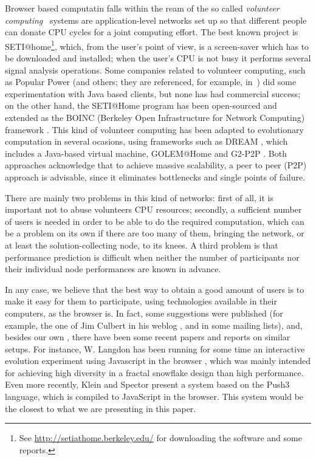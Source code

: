 \documentclass{llncs}
\begin{document}
Browser based computatin falls within the ream of the so called  {\em volunteer
computing}~\cite{sarmenta-bayanihan,hpvc} systems are
application-level networks set up so that different people
can donate CPU cycles for a joint computing  effort.
The best known project is SETI@home\footnote{See
\url{http://setiathome.berkeley.edu/} for downloading the software  and some
reports.}, which, from the user's point of view, is a screen-saver which has to be
downloaded and installed; when the user's CPU is not busy it performs
several signal analysis operations.
Some companies related to volunteer computing, such as Popular Power (and
others; they are referenced,
for example, in~\cite{Cappello}) did some experimentation with Java based
clients, but none has had commercial success; on the other hand, the
SETI@Home program has been open-sourced and extended as the BOINC
(Berkeley Open Infrastructure for Network Computing) 
framework \cite{boinc_grid04}. This kind of volunteer computing has
been adapted to evolutionary computation in several ocasions, using
frameworks such as DREAM \cite{LNCS2439:ID197:pp665}, which includes a
Java-based virtual machine, GOLEM@Home and G2-P2P \cite{G2-P2P}. Both approaches
acknowledge that to achieve massive scalability, a peer to peer (P2P)
approach is advisable, since it eliminates bottlenecks and single
points of failure. 

There are mainly two problems in this kind of networks: first of all,
it is important not to abuse volunteers CPU resources; secondly, a
sufficient number of users is needed in order to be able to do the
required computation, which can be a problem on its own if there are
too many of them, bringing the network, or at least the
solution-collecting node, to its knees. A third problem is that
performance prediction is difficult when neither the number of
participants nor their individual node performances are known in
advance.

In any case, we believe that the best way to obtain a good amount of
users is to make it easy for them to participate, using technologies
available in their computers, as the browser is. In fact, some
suggestions were published (for example, the one of Jim Culbert in his
weblog \cite{ajax:dc}, and in some mailing lists), and, besides our
own \cite{gecco07:workshop:dcor}, there have been some recent papers
and reports on similar setups. For instance, W. Langdon has been
running for some time an interactive evolution experiment using
Javascript in the browser \cite{langdon:2005:metas}, which was mainly
intended for achieving high diversity in a fractal snowflake design
than high performance. Even more recently, Klein and Spector
\cite{unwitting-ec} present a system based on the Push3 language,
which is compiled to JavaScript in the browser. This system would be
the closest to what we are presenting in this paper. 
\end{document}
